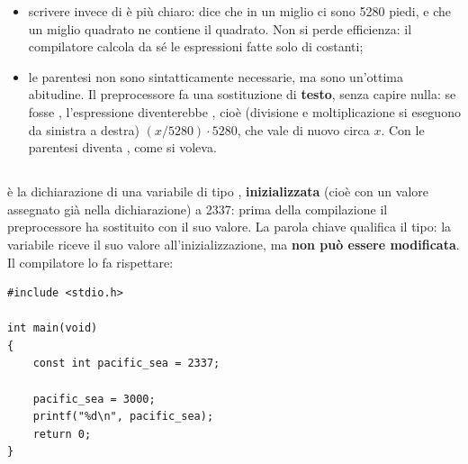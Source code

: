 \begin{itemize}
  \item scrivere  invece di  è più
        chiaro: dice che in un miglio ci sono 5280 piedi, e che un miglio
        quadrato ne contiene il quadrato. Non si perde efficienza: il
        compilatore calcola da sé le espressioni fatte solo di costanti;
  \item le parentesi non sono sintatticamente necessarie, ma sono un'ottima
        abitudine. Il preprocessore fa una sostituzione di
        \textbf{testo}, senza capire nulla: se fosse
        , l'espressione
         diventerebbe
        , cioè (divisione e moltiplicazione si
        eseguono da sinistra a destra) $(x / 5280) \cdot 5280$, che vale di
        nuovo circa $x$. Con le parentesi diventa
        , come si voleva.
\end{itemize}

\subsection{}

 è la dichiarazione di una variabile
 di tipo , \textbf{inizializzata} (cioè con un
valore assegnato già nella dichiarazione) a 2337: prima della compilazione
il preprocessore ha sostituito  con il suo valore. La parola
chiave  qualifica il tipo: la variabile riceve il suo valore
all'inizializzazione, ma \textbf{non può essere modificata}. Il compilatore
lo fa rispettare:

\begin{affianco}[0.5]
\begin{lstlisting}[style=c, name=costante.c]
#include <stdio.h>

int main(void)
{
    const int pacific_sea = 2337;

    pacific_sea = 3000;
    printf("%d\n", pacific_sea);
    return 0;
}
\end{lstlisting}
\risultato
{}
\end{affianco}

